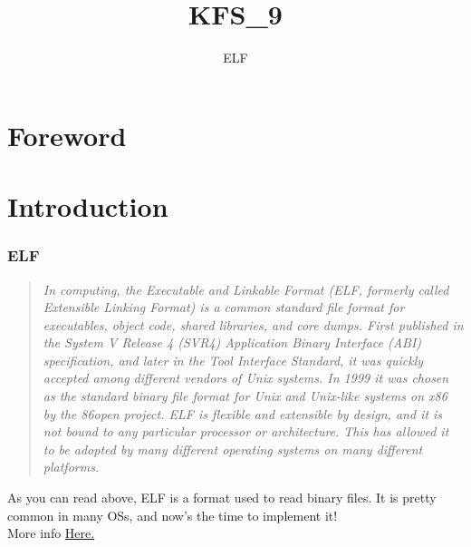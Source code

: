 \documentclass{42-en}
\begin{document}
                           \title{KFS\_9}
                          \subtitle{ELF}


\maketitle

\tableofcontents


\chapter{Foreword}

\chapter{Introduction}
    \subsection{ELF}
        \begin{quotation}
        \textit{In computing, the Executable and Linkable Format (ELF, formerly
        called Extensible Linking Format) is a common standard file format for
        executables, object code, shared libraries, and core dumps. First
        published in the System V Release 4 (SVR4) Application Binary Interface
        (ABI) specification, and later in the Tool Interface Standard, it
        was quickly accepted among different vendors of Unix systems. In 1999
        it was chosen as the standard binary file format for Unix and Unix-like
        systems on x86 by the 86open project.
        ELF is flexible and extensible by design, and it is not bound to any
        particular processor or architecture. This has allowed it to be adopted
        by many different operating systems on many different platforms.}
        \end{quotation}
        As you can read above, ELF is a format used to read binary files.
        It is pretty common in many OSs, and now's the time to implement it!\\
        More info \href{http://wiki.osdev.org/ELF}{Here.}
\end{document}

